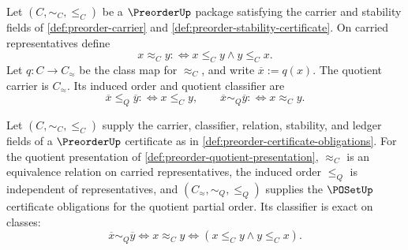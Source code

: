 \begin{definition}
\label{def:preorder-quotient-presentation}
Let $(C,\sim_C,\le_C)$ be a $\PreorderUp$ package satisfying the carrier and stability fields of \autoref{def:preorder-carrier} and \autoref{def:preorder-stability-certificate}. On carried representatives define
$$
x\approx_C y :\Longleftrightarrow x\le_C y\land y\le_C x.
$$
Let $q:C\to C_{\!\approx}$ be the class map for $\approx_C$, and write $\overline{x}:=q(x)$. The quotient carrier is $C_{\!\approx}$. Its induced order and quotient classifier are
$$
\overline{x}\le_Q\overline{y} :\Longleftrightarrow x\le_C y,
\qquad
\overline{x}\sim_Q\overline{y} :\Longleftrightarrow x\approx_C y.
$$
\end{definition}

\begin{theorem}
\label{thm:preorder-quotient-yields-poset}
Let $(C,\sim_C,\le_C)$ supply the carrier, classifier, relation, stability, and ledger fields of a $\PreorderUp$ certificate as in \autoref{def:preorder-certificate-obligations}. For the quotient presentation of \autoref{def:preorder-quotient-presentation}, $\approx_C$ is an equivalence relation on carried representatives, the induced order $\le_Q$ is independent of representatives, and $(C_{\!\approx},\sim_Q,\le_Q)$ supplies the $\POSetUp$ certificate obligations for the quotient partial order. Its classifier is exact on classes:
$$
\overline{x}\sim_Q\overline{y}
\Longleftrightarrow
x\approx_C y
\Longleftrightarrow
(x\le_C y\land y\le_C x).
$$
\end{theorem}
